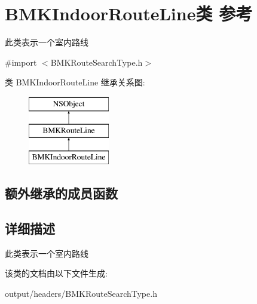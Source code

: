\hypertarget{interface_b_m_k_indoor_route_line}{}\section{B\+M\+K\+Indoor\+Route\+Line类 参考}
\label{interface_b_m_k_indoor_route_line}


此类表示一个室内路线  




{\ttfamily \#import $<$B\+M\+K\+Route\+Search\+Type.\+h$>$}

类 B\+M\+K\+Indoor\+Route\+Line 继承关系图\+:\begin{figure}[H]
\begin{center}
\leavevmode
\includegraphics[height=3.000000cm]{interface_b_m_k_indoor_route_line}
\end{center}
\end{figure}
\subsection*{额外继承的成员函数}


\subsection{详细描述}
此类表示一个室内路线 

该类的文档由以下文件生成\+:\begin{DoxyCompactItemize}
\item 
output/headers/B\+M\+K\+Route\+Search\+Type.\+h\end{DoxyCompactItemize}
